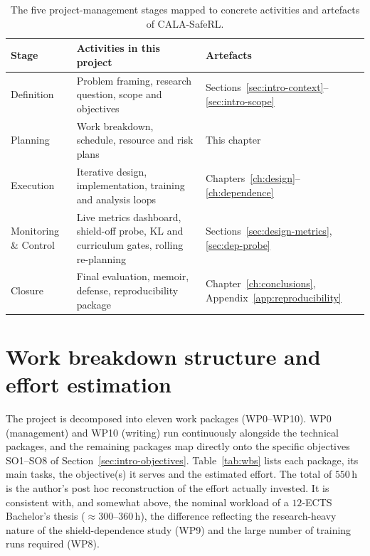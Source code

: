 \begin{table}[H]
  \centering
  \caption{The five project-management stages mapped to concrete activities and artefacts of
           CALA-SafeRL.}
  \label{tab:stages}
  \small
  \begin{tabular}{@{}lp{6.0cm}p{4.6cm}@{}}
    \toprule
    \textbf{Stage} & \textbf{Activities in this project} & \textbf{Artefacts} \\
    \midrule
    Definition            & Problem framing, research question, scope and objectives
                          & Sections~\ref{sec:intro-context}--\ref{sec:intro-scope} \\
    Planning              & Work breakdown, schedule, resource and risk plans
                          & This chapter \\
    Execution             & Iterative design, implementation, training and analysis loops
                          & Chapters~\ref{ch:design}--\ref{ch:dependence} \\
    Monitoring \& Control & Live metrics dashboard, shield-off probe, KL and curriculum gates,
                            rolling re-planning
                          & Sections~\ref{sec:design-metrics}, \ref{sec:dep-probe} \\
    Closure               & Final evaluation, memoir, defense, reproducibility package
                          & Chapter~\ref{ch:conclusions}, Appendix~\ref{app:reproducibility} \\
    \bottomrule
  \end{tabular}
\end{table}

\section{Work breakdown structure and effort estimation}\label{sec:plan-wbs}

The project is decomposed into eleven work packages (WP0--WP10). WP0 (management) and WP10
(writing) run continuously alongside the technical packages, and the remaining packages map directly
onto the specific objectives SO1--SO8 of Section~\ref{sec:intro-objectives}.
Table~\ref{tab:wbs} lists each package, its main tasks, the objective(s) it serves and the
estimated effort. The total of \(550\,\mathrm{h}\) is the author's post hoc reconstruction of the
effort actually invested. It is consistent with, and somewhat above, the nominal workload of a
\(12\)-ECTS Bachelor's thesis (\(\approx 300\text{--}360\,\mathrm{h}\)), the difference reflecting
the research-heavy nature of the shield-dependence study (WP9) and the large number of training
runs required (WP8).

